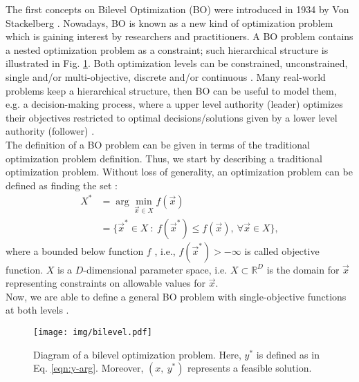 \documentclass[conference]{IEEEtran}
\theoremstyle{definition}
\begin{document}
The first concepts on Bilevel Optimization (BO) were introduced in 1934 by Von
Stackelberg \cite{von2010market}. Nowadays, BO is known as a new kind of optimization
problem which is gaining interest by researchers and practitioners. A BO problem
contains a nested optimization problem as a constraint; such hierarchical structure
is illustrated in Fig. \ref{fig:bilevel}. Both optimization levels can be constrained,
unconstrained, single and/or multi-objective, discrete and/or continuous
\cite{bard2013practical,dempe2002foundations}. Many real-world problems keep a hierarchical
structure, then BO can be useful to model them, e.g. a decision-making process,
where a upper level authority (leader) optimizes their objectives restricted to
optimal decisions/solutions given by a  lower level authority (follower)
\cite{brotcorne2001bilevel,kalashnikov2010comparison,sinha2015transportation,von1945theory,wang2014bilevel}.\\

The definition of a BO problem can be given in terms of the traditional
optimization problem definition. Thus, we start by describing a traditional optimization
problem. Without loss of generality, an optimization problem can be defined as
finding the set \cite{chong2013introduction,rao2009engineering}:
% 
\begin{align}
    \label{eqn:Xargmin}
    X^* &= \arg \min_{\vec{x} \in X} f(\vec{x}) \\ \nonumber
    &= \{ \vec{x}^* \in X \ : \ f(\vec{x}^*) \leq f( \vec{x} ), \ 
    \forall
    \vec{x} \in X \},
\end{align}
% 
where a bounded below function $f$ , i.e., $f(\vec{x}^*)> -\infty$ is called objective
function. $X$ is a $D$-dimensional parameter space, i.e. $X \subset \mathbb{R}^D$
is the domain for $\vec{x}$ representing constraints on
allowable values for $\vec{x}$.\\

Now, we are able to define a general BO problem with
single-objective functions at both levels
\cite{bard2013practical,dempe2002foundations}.%

\begin{figure}[!ht]
    \centering
    \texttt{[image: img/bilevel.pdf]}
    \caption{Diagram of a bilevel optimization problem. Here, $y^*$ 
            is defined as in Eq. \ref{eqn:y-arg}. Moreover, $(x,\ y^*)$
            represents a feasible solution.}
    \label{fig:bilevel}
\end{figure}
% 
\end{document}

